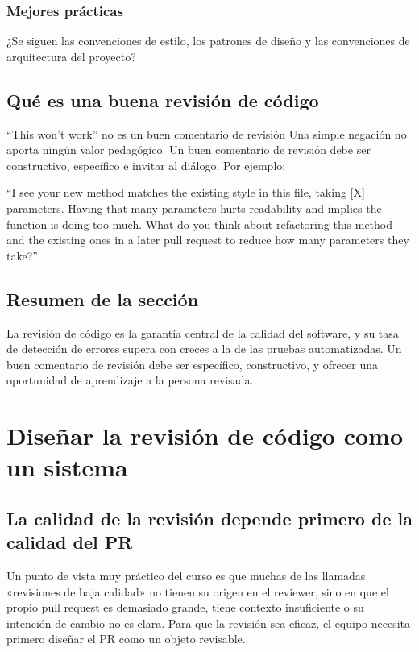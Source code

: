 \documentclass[a4paper]{article}
\begin{document}
\subsubsection{Mejores prácticas}

¿Se siguen las convenciones de estilo, los patrones de diseño y las convenciones de arquitectura del proyecto?

\subsection{Qué es una buena revisión de código}

\begin{warningbox}{``This won't work'' no es un buen comentario de revisión}
Una simple negación no aporta ningún valor pedagógico. Un buen comentario de revisión debe ser constructivo, específico e invitar al diálogo. Por ejemplo:

``I see your new method matches the existing style in this file, taking {[}X{]} parameters. Having that many parameters hurts readability and implies the function is doing too much. What do you think about refactoring this method and the existing ones in a later pull request to reduce how many parameters they take?''
\end{warningbox}

\subsection{Resumen de la sección}

La revisión de código es la garantía central de la calidad del software, y su tasa de detección de errores supera con creces a la de las pruebas automatizadas. Un buen comentario de revisión debe ser específico, constructivo, y ofrecer una oportunidad de aprendizaje a la persona revisada.
\section{Diseñar la revisión de código como un sistema}

\subsection{La calidad de la revisión depende primero de la calidad del PR}

Un punto de vista muy práctico del curso es que muchas de las llamadas «revisiones de baja calidad» no tienen su origen en el reviewer, sino en que el propio pull request es demasiado grande, tiene contexto insuficiente o su intención de cambio no es clara. Para que la revisión sea eficaz, el equipo necesita primero diseñar el PR como un objeto revisable.
\end{document}
